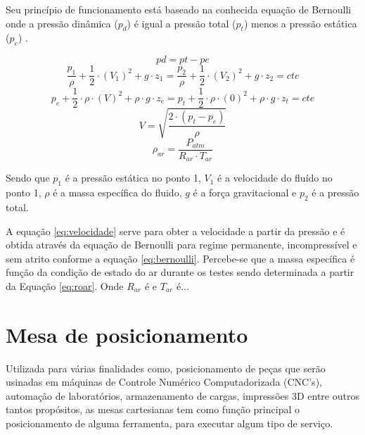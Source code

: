 Seu princípio de funcionamento está baseado na conhecida equação de Bernoulli onde 
a pressão dinâmica ($p_{d}$) é igual a pressão total ($p_{t}$) menos a pressão estática ($p_{e}$) \cite{pritchard2005fox}.

\begin{equation}\label{eq:pdinamica}
    pd = pt - pe
\end{equation}
\begin{equation}\label{eq:bernoulli}
    \frac{p_{1}}{\rho} + \frac{1}{2} \cdot (V_{1})^{2} + g \cdot z_{1} = \frac{p_{2}}{\rho} + \frac{1}{2} \cdot (V_{2})^{2} + g \cdot z_{2} = cte  
\end{equation}
\begin{equation}\label{eq:binicial}
    p_{e} + \frac{1}{2} \cdot \rho \cdot (V)^{2} + \rho \cdot g \cdot z_{e} = p_{t} + \frac{1}{2} \cdot \rho \cdot (0)^{2} + \rho \cdot g \cdot z_{t} = cte  
\end{equation}
\begin{equation}\label{eq:velocidade}
    V = \sqrt{\frac{2 \cdot (p_{t} - p_{e})}{\rho}}
\end{equation}
\begin{equation}\label{eq:roar}
    \rho_{ar} = \frac{P_{atm}}{R_{ar} \cdot T_{ar}}
\end{equation}

Sendo que $p_{1}$ é a pressão estática no ponto 1, $V_{1}$ é a velocidade do fluído no ponto 1, $\rho$ 
é a massa específica do fluido, $g$ é a força gravitacional e $p_{2}$ é a pressão total.

A equação \ref{eq:velocidade} serve para obter a velocidade a partir da pressão e é obtida 
através da equação de Bernoulli para regime permanente, incompressível e sem atrito 
conforme a equação \ref{eq:bernoulli}. Percebe-se que a massa específica é função da condição 
de estado do ar durante os testes sendo determinada a partir da Equação \ref{eq:roar}. 
Onde $R_{ar}$ é e $T_{ar}$ é...

\section{Mesa de posicionamento}\label{sec:mesa}

Utilizada para várias finalidades como, posicionamento de peças que serão usinadas em máquinas de Controle 
Numérico Computadorizada (CNC’s), automação de laboratórios, armazenamento de cargas, impressões 3D entre 
outros tantos propósitos, as mesas cartesianas tem como função principal o posicionamento de alguma 
ferramenta, para executar algum tipo de serviço.


